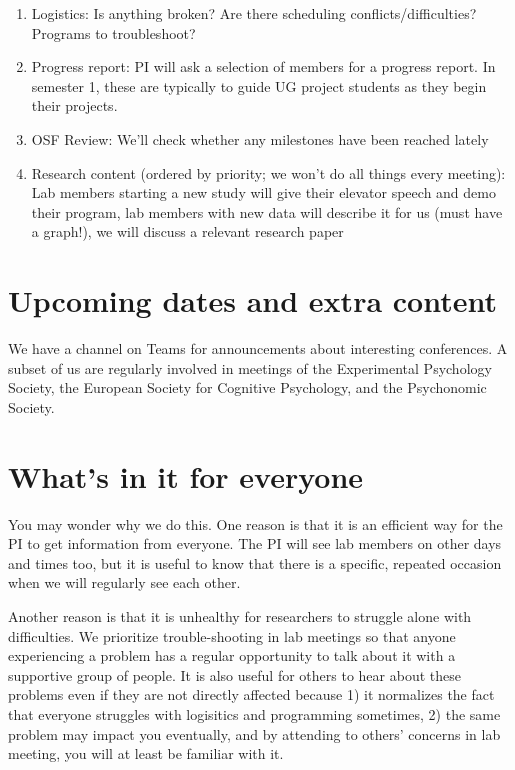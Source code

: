 \documentclass[
  12pt,
]{book}
\providecommand{\tightlist}{%
  \setlength{\itemsep}{0pt}\setlength{\parskip}{0pt}}
\begin{document}
\begin{enumerate}
\def\labelenumi{\arabic{enumi}.}
\tightlist
\item
  Logistics: Is anything broken? Are there scheduling conflicts/difficulties? Programs to troubleshoot?
\item
  Progress report: PI will ask a selection of members for a progress report. In semester 1, these are typically to guide UG project students as they begin their projects.
\item
  OSF Review: We'll check whether any milestones have been reached lately
\item
  Research content (ordered by priority; we won't do all things every meeting): Lab members starting a new study will give their elevator speech and demo their program, lab members with new data will describe it for us (must have a graph!), we will discuss a relevant research paper
\end{enumerate}

\section{Upcoming dates and extra content}\label{upcoming-dates-and-extra-content}

We have a channel on Teams for announcements about interesting conferences. A subset of us are regularly involved in meetings of the Experimental Psychology Society, the European Society for Cognitive Psychology, and the Psychonomic Society.

\section{What's in it for everyone}\label{whats-in-it-for-everyone}

You may wonder why we do this. One reason is that it is an efficient way for the PI to get information from everyone. The PI will see lab members on other days and times too, but it is useful to know that there is a specific, repeated occasion when we will regularly see each other.

Another reason is that it is unhealthy for researchers to struggle alone with difficulties. We prioritize trouble-shooting in lab meetings so that anyone experiencing a problem has a regular opportunity to talk about it with a supportive group of people. It is also useful for others to hear about these problems even if they are not directly affected because 1) it normalizes the fact that everyone struggles with logisitics and programming sometimes, 2) the same problem may impact you eventually, and by attending to others' concerns in lab meeting, you will at least be familiar with it.
\end{document}
